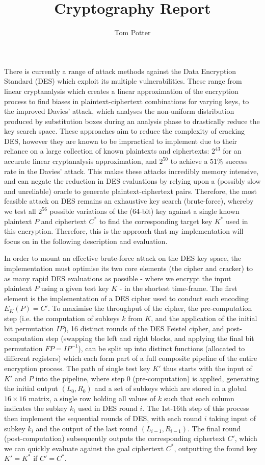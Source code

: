 \documentclass[a4paper, 11pt]{article}
\title{Cryptography Report}
\author{Tom Potter}
\date{}
\begin{document}
\maketitle

There is currently a range of attack methods against the Data Encryption Standard (DES) which exploit its multiple vulnerabilities. These range from linear cryptanalysis which creates a linear approximation of the encryption process to find biases in plaintext-ciphertext combinations for varying keys, to the improved Davies' attack, which analyses the non-uniform distribution produced by substitution boxes during an analysis phase to drastically reduce the key search space. These approaches aim to reduce the complexity of cracking DES, however they are known to be impractical to implement due to their reliance on a large collection of known plaintexts and ciphertexts: $2^{43}$ for an accurate linear cryptanalysis approximation, and $2^{50}$ to achieve a $51\%$ success rate in the Davies' attack. This makes these attacks incredibly memory intensive, and can negate the reduction in DES evaluations by relying upon a (possibly slow and unreliable) oracle to generate plaintext-ciphertext pairs. Therefore, the most feasible attack on DES remains an exhaustive key search (brute-force), whereby we test all $2^{56}$ possible variations of the (64-bit) key against a single known plaintext $P$ and ciphertext $C^{*}$ to find the corresponding target key $K^{*}$ used in this encryption. Therefore, this is the approach that my implementation will focus on in the following description and evaluation.

In order to mount an effective brute-force attack on the DES key space, the implementation must optimise its two core elements (the cipher and cracker) to as many rapid DES evaluations as possible - where we encrypt the input plaintext $P$ using a given test key $K$ - in the shortest time-frame. The first element is the implementation of a DES cipher used to conduct each encoding $E_{K}(P) = C'$. To maximise the throughput of the cipher, the pre-computation step (i.e. the computation of subkeys $k$ from $K$, and the application of the initial bit permutation $IP$), 16 distinct rounds of the DES Feistel cipher, and post-computation step (swapping the left and right blocks, and applying the final bit permutation $FP=IP^{-1}$), can be split up into distinct functions (allocated to different registers) which each form part of a full composite pipeline of the entire encryption process. The path of single test key $K'$ thus starts with the input of $K'$ and $P$ into the pipeline, where step 0 (pre-computation) is applied, generating the initial output $(L_{0}, R_{0})$ and a set of subkeys which are stored in a global $16 \times 16$ matrix, a single row holding all values of $k$ such that each column indicates the subkey $k_i$ used in DES round $i$. The 1st-16th step of this process then implement the sequential rounds of DES, with each round $i$ taking input of subkey $k_i$ and the output of the last round $(L_{i-1}, R_{i-1})$. The final round (post-computation) subsequently outputs the corresponding ciphertext $C'$, which we can quickly evaluate against the goal ciphertext $C^{*}$, outputting the found key $K' = K^{*}$ if $C' = C^{*}$.
\end{document}
